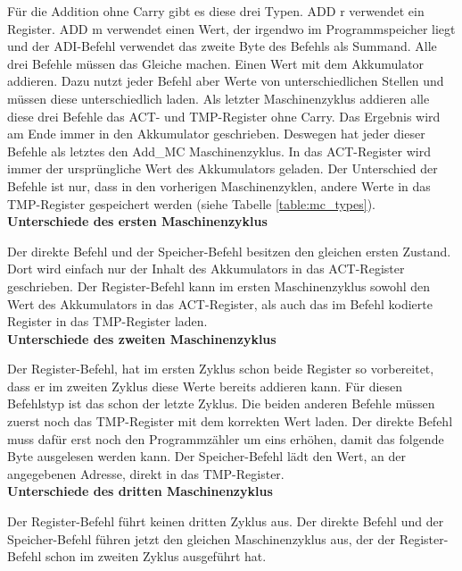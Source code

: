 \documentclass[12pt]{article}
\begin{document}
\noindent
Für die Addition ohne Carry gibt es diese drei Typen. ADD r verwendet ein Register. ADD m verwendet einen Wert, der irgendwo im Programmspeicher liegt und der ADI-Befehl verwendet das zweite Byte des Befehls als Summand. Alle drei Befehle müssen das Gleiche machen. Einen Wert mit dem Akkumulator addieren. Dazu nutzt jeder Befehl aber Werte von unterschiedlichen Stellen und müssen diese unterschiedlich laden. 
Als letzter Maschinenzyklus addieren alle diese drei Befehle das ACT- und TMP-Register ohne Carry. Das Ergebnis wird am Ende immer in den Akkumulator geschrieben. Deswegen hat jeder dieser Befehle als letztes den Add\_MC Maschinenzyklus. 
In das ACT-Register wird immer der ursprüngliche Wert des Akkumulators geladen. Der Unterschied der Befehle ist nur, dass in den vorherigen Maschinenzyklen, andere Werte in das TMP-Register gespeichert werden (siehe Tabelle \ref{table:mc_types}). 
\\

\noindent
\textbf{Unterschiede des ersten Maschinenzyklus}

\noindent
Der direkte Befehl und der Speicher-Befehl besitzen den gleichen ersten Zustand. Dort wird einfach nur der Inhalt des Akkumulators in das ACT-Register geschrieben.
Der Register-Befehl kann im ersten Maschinenzyklus sowohl den Wert des Akkumulators in das ACT-Register, als auch das im Befehl kodierte Register in das TMP-Register laden.
\\

\noindent
\textbf{Unterschiede des zweiten Maschinenzyklus}

\noindent
Der Register-Befehl, hat im ersten Zyklus schon beide Register so vorbereitet, dass er im zweiten Zyklus diese Werte bereits addieren kann. Für diesen Befehlstyp ist das schon der letzte Zyklus.
Die beiden anderen Befehle müssen zuerst noch das TMP-Register mit dem korrekten Wert laden. Der direkte Befehl muss dafür erst noch den Programmzähler um eins erhöhen, damit das folgende Byte ausgelesen werden kann. Der Speicher-Befehl lädt den Wert, an der angegebenen Adresse, direkt in das TMP-Register.
\\

\noindent
\textbf{Unterschiede des dritten Maschinenzyklus}

\noindent
Der Register-Befehl führt keinen dritten Zyklus aus.
Der direkte Befehl und der Speicher-Befehl führen jetzt den gleichen Maschinenzyklus aus, der der Register-Befehl schon im zweiten Zyklus ausgeführt hat.
\end{document}
